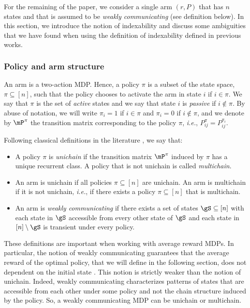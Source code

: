 For the remaining of the paper, we consider a single arm $(r, P)$ that has $n$ states and that is assumed to be \emph{weakly communicating} (see definition below). In this section, we introduce the notion of indexability and discuss some ambiguities that we have found when using the definition of indexability defined in previous works.

\subsubsection{Policy and arm structure}

An arm is a two-action MDP. Hence, a policy $\pi$ is a subset of the state space, $\pi\subseteq[n]$, such that the policy chooses to activate the arm in state $i$ if $i\in\pi$. We say that $\pi$ is the set of \emph{active} states and we say that state $i$ is \emph{passive} if $i\not\in\pi$. By abuse of notation, we will write $\pi_i=1$ if $i\in\pi$ and $\pi_i=0$ if $i\not\in\pi$, and we denote by $\mP^\pi$ the transition matrix corresponding to the policy $\pi$, \emph{i.e.}, $P^\pi_{ij}=P^{\pi_i}_{ij}$.

Following classical definitions in the literature \cite{puterman2014markov}, we say that:
\begin{itemize}
    \item A policy $\pi$ is \emph{unichain} if the transition matrix $\mP^\pi$ induced by $\pi$ has a unique recurrent class. A policy that is not unichain is called \emph{multichain}.
    \item An arm is unichain if all policies $\pi\subseteq[n]$ are unichain. An arm is multichain if it is not unichain, \emph{i.e.}, if there exists a policy $\pi\subseteq[n]$ that is multichain.
    \item An arm is \emph{weakly communicating} if there exists a set of states $\gS\subseteq[n]$ with each state in $\gS$ accessible from every other state of $\gS$ and each state in $[n]\setminus\gS$ is transient under every policy.
\end{itemize}
These definitions are important when working with average reward MDPs. In particular, the notion of weakly communicating guarantees that the average reward of the optimal policy, that we will define in the following section, does not dependent on the initial state \cite{puterman2014markov}. This notion is strictly weaker than the notion of unichain. 
Indeed, weakly communicating characterizes patterns of states that are accessible from each other under some policy and not the chain structure induced by the policy.
So, a weakly communicating MDP can be unichain or multichain.

